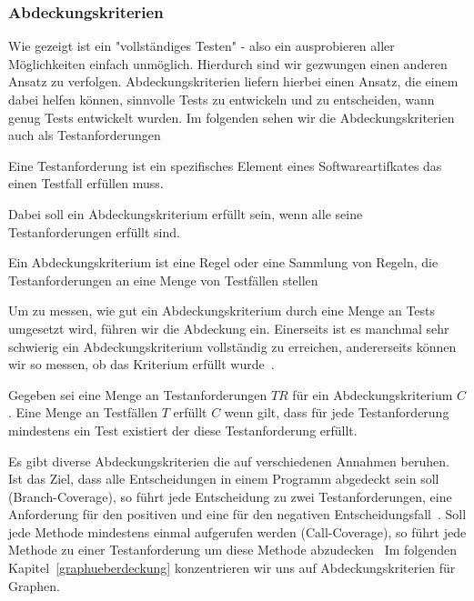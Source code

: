 \subsubsection{Abdeckungskriterien}

Wie gezeigt ist ein "vollständiges Testen" - also ein ausprobieren aller Möglichkeiten einfach unmöglich.
Hierdurch sind wir gezwungen einen anderen Ansatz zu verfolgen.
Abdeckungskriterien liefern hierbei einen Ansatz, die einem dabei helfen können, sinnvolle Tests zu entwickeln und zu entscheiden, wann genug Tests entwickelt wurden.
Im folgenden sehen wir die Abdeckungskriterien auch als Testanforderungen~\cite[vgl. 1.3 Coverage Criteria for Testing]{software-testing}

\begin{definition}
    Eine Testanforderung ist ein spezifisches Element eines Softwareartifkates das einen Testfall erfüllen muss.~\cite[Def. 1.20]{software-testing}
\end{definition}

Dabei soll ein Abdeckungskriterium erfüllt sein, wenn alle seine Testanforderungen erfüllt sind.

\begin{definition}
    Ein Abdeckungskriterium ist eine Regel oder eine Sammlung von Regeln, die Testanforderungen an eine Menge von Testfällen stellen~\cite[Def. 1.21]{software-testing}
\end{definition}

Um zu messen, wie gut ein Abdeckungskriterium durch eine Menge an Tests umgesetzt wird, führen wir die Abdeckung ein.
Einerseits ist es manchmal sehr schwierig ein Abdeckungskriterium vollständig zu erreichen, andererseits können
wir so messen, ob das Kriterium erfüllt wurde~\cite[vgl. S. 18]{software-testing}.

\begin{definition}
    Gegeben sei eine Menge an Testanforderungen $TR$ für ein Abdeckungskriterium $C$. 
    Eine Menge an Testfällen $T$ erfüllt $C$ wenn gilt, 
    dass für jede Testanforderung mindestens ein Test existiert der diese Testanforderung erfüllt.~\cite[vgl. Def. 1.22]{software-testing}
\end{definition}

Es gibt diverse Abdeckungskriterien die auf verschiedenen Annahmen beruhen.
Ist das Ziel, dass alle Entscheidungen in einem Programm abgedeckt sein soll (Branch-Coverage), so führt jede Entscheidung zu zwei
Testanforderungen, eine Anforderung für den positiven und eine für den negativen Entscheidungsfall~\cite[vgl. S. 17]{software-testing}.
Soll jede Methode mindestens einmal aufgerufen werden (Call-Coverage), so führt jede Methode zu einer Testanforderung um diese Methode abzudecken~\cite[vgl. S. 17]{software-testing}
Im folgenden Kapitel~\ref{graphueberdeckung} konzentrieren wir uns auf Abdeckungskriterien für Graphen.